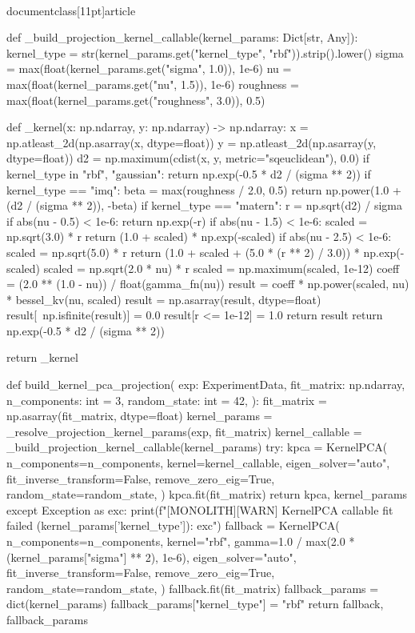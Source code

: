 \\documentclass[11pt]{article}
\begin{document}
\begin{CodeBlock}
def _build_projection_kernel_callable(kernel_params: Dict[str, Any]):
    kernel_type = str(kernel_params.get("kernel_type", "rbf")).strip().lower()
    sigma = max(float(kernel_params.get("sigma", 1.0)), 1e-6)
    nu = max(float(kernel_params.get("nu", 1.5)), 1e-6)
    roughness = max(float(kernel_params.get("roughness", 3.0)), 0.5)

    def _kernel(x: np.ndarray, y: np.ndarray) -> np.ndarray:
        x = np.atleast_2d(np.asarray(x, dtype=float))
        y = np.atleast_2d(np.asarray(y, dtype=float))
        d2 = np.maximum(cdist(x, y, metric="sqeuclidean"), 0.0)
        if kernel_type in {"rbf", "gaussian"}:
            return np.exp(-0.5 * d2 / (sigma ** 2))
        if kernel_type == "imq":
            beta = max(roughness / 2.0, 0.5)
            return np.power(1.0 + (d2 / (sigma ** 2)), -beta)
        if kernel_type == "matern":
            r = np.sqrt(d2) / sigma
            if abs(nu - 0.5) < 1e-6:
                return np.exp(-r)
            if abs(nu - 1.5) < 1e-6:
                scaled = np.sqrt(3.0) * r
                return (1.0 + scaled) * np.exp(-scaled)
            if abs(nu - 2.5) < 1e-6:
                scaled = np.sqrt(5.0) * r
                return (1.0 + scaled + (5.0 * (r ** 2) / 3.0)) * np.exp(-scaled)
            scaled = np.sqrt(2.0 * nu) * r
            scaled = np.maximum(scaled, 1e-12)
            coeff = (2.0 ** (1.0 - nu)) / float(gamma_fn(nu))
            result = coeff * np.power(scaled, nu) * bessel_kv(nu, scaled)
            result = np.asarray(result, dtype=float)
            result[~np.isfinite(result)] = 0.0
            result[r <= 1e-12] = 1.0
            return result
        return np.exp(-0.5 * d2 / (sigma ** 2))

    return _kernel


def build_kernel_pca_projection(
    exp: ExperimentData,
    fit_matrix: np.ndarray,
    n_components: int = 3,
    random_state: int = 42,
):
    fit_matrix = np.asarray(fit_matrix, dtype=float)
    kernel_params = _resolve_projection_kernel_params(exp, fit_matrix)
    kernel_callable = _build_projection_kernel_callable(kernel_params)
    try:
        kpca = KernelPCA(
            n_components=n_components,
            kernel=kernel_callable,
            eigen_solver="auto",
            fit_inverse_transform=False,
            remove_zero_eig=True,
            random_state=random_state,
        )
        kpca.fit(fit_matrix)
        return kpca, kernel_params
    except Exception as exc:
        print(f"[MONOLITH][WARN] KernelPCA callable fit failed ({kernel_params['kernel_type']}): {exc}")
        fallback = KernelPCA(
            n_components=n_components,
            kernel="rbf",
            gamma=1.0 / max(2.0 * (kernel_params["sigma"] ** 2), 1e-6),
            eigen_solver="auto",
            fit_inverse_transform=False,
            remove_zero_eig=True,
            random_state=random_state,
        )
        fallback.fit(fit_matrix)
        fallback_params = dict(kernel_params)
        fallback_params["kernel_type"] = "rbf"
        return fallback, fallback_params



\end{CodeBlock}
\end{document}
